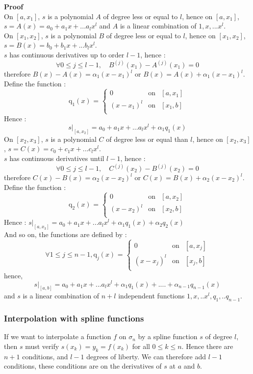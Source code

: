 \documentclass[a4paper,11pt]{book}
\begin{document}
{\bf Proof}\\
On $[a,x_1]$, $s$ is a polynomial $A$ of degree less or equal to
$l$, hence on $[a,x_1]$, $s=A(x)=a_0+a_1x+...a_lx^l$ and  $A$ is a linear 
combination of $1,x,...x^l$.\\
On $[x_1,x_2]$, $s$ is a polynomial $B$ of degree less or equal to
$l$, hence on $[x_1,x_2]$, $s=B(x)=b_0+b_1x+...b_lx^l$.\\
$s$ has continuous derivatives up to order $l-1$, hence :
\[ \forall 0 \leq j \leq l-1, \quad  B^{(j)}(x_1)-A^{(j)}(x_1)=0\]
therefore $B(x)-A(x)=\alpha_1(x-x_1)^l$ or $B(x)=A(x)+\alpha_1(x-x_1)^l$.\\
Define the function :
\[\mbox{q}_1(x)  \mbox{ = }
\left\{
\begin{array}{rcl}
0 & \mbox{on} & [a,x_1] \\
(x-x_1)^l  & \mbox{on} & [x_1,b]\\
\end{array} 
\right.
\]
Hence :
\[ s|_{[a,x_2]}=a_0+a_1x+...a_lx^l+\alpha_1q_1(x) \]
On $[x_2,x_3]$, $s$ is a polynomial $C$ of degree less or equal than
$l$, hence on $[x_2,x_3]$, $s=C(x)=c_0+c_1x+...c_lx^l$.\\
$s$ has continuous derivatives until $l-1$, hence :  
\[ \forall 0 \leq j \leq l-1, \quad  C^{(j)}(x_2)-B^{(j)}(x_2)=0\]
therefore $C(x)-B(x)=\alpha_2(x-x_2)^l$ or $C(x)=B(x)+\alpha_2(x-x_2)^l$.\\
Define the function :
\[\mbox{q}_2(x)  \mbox{ = }
\left\{
\begin{array}{rcl}
0 & \mbox{on} & [a,x_2] \\
(x-x_2)^l  & \mbox{on} & [x_2,b]\\
\end{array} 
\right.
\]
Hence :
$s|_{[a,x_3]}=a_0+a_1x+...a_lx^l+\alpha_1q_1(x)+\alpha_2q_2(x)$\\
And so on, the functions are defined by :
\[\forall 1 \leq j \leq n-1, \mbox{q}_j(x)  \mbox{ = }
\left\{
\begin{array}{rcl}
0 & \mbox{on} & [a,x_j] \\
(x-x_j)^l  & \mbox{on} & [x_j,b]\\
\end{array} 
\right.
\]
hence,
\[ s|_{[a,b]}=a_0+a_1x+...a_lx^l+\alpha_1q_1(x)+....+\alpha_{n-1}q_{n-1}(x) \]
and $s$ is a linear combination of $n+l$ independent functions 
$1,x,..x^l,q_1,..q_{n-1}$.

\subsubsection{Interpolation with spline functions}
If we want to interpolate a function $f$ on $\sigma_n$ by a spline function
 $s$ of degree $l$, then $s$ must verify $s(x_k)=y_k=f(x_k)$ for all 
$0\leq k\leq n$. Hence there are $n+1$ conditions, and $l-1$ degrees of 
liberty. We can therefore add $l-1$ conditions, these conditions are on the 
derivatives of $s$ at $a$ and  $b$.
\end{document}
